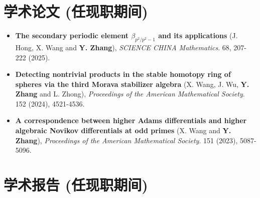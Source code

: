 \documentclass[12pt,a4paper,sans,fontset=windows]{moderncv} %
\begin{document}


\section{学术论文 (任现职期间)}

\vspace{3pt} 

\begin{itemize}[wide=30pt, leftmargin=*]
    \item \textbf{The secondary periodic element $\beta_{p^2/p^2-1}$ and its applications}
        \newline (J. Hong, X. Wang and \textbf{Y. Zhang}), \textit{SCIENCE CHINA Mathematics}. 68, 207-222 (2025).
    \item \textbf{Detecting nontrivial products in the stable homotopy ring of spheres via the third Morava stabilizer algebra}
    \newline (X. Wang, J. Wu, \textbf{Y. Zhang} and L. Zhong), \textit{Proceedings of the American Mathematical Society}. 152 (2024), 4521-4536.
    \item \textbf{A correspondence between higher Adams differentials and higher algebraic Novikov differentials at odd primes}
        \newline (X. Wang and \textbf{Y. Zhang}), \textit{Proceedings of the American Mathematical Society}. 151 (2023), 5087-5096.
\end{itemize}

\vspace{2pt} 


\section{学术报告 (任现职期间)}


\vspace{2pt} 


\vspace{2pt} 


\vspace{2pt} 
\end{document}
